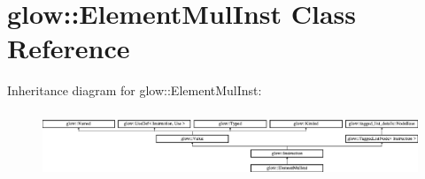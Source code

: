 \hypertarget{classglow_1_1_element_mul_inst}{}\section{glow\+:\+:Element\+Mul\+Inst Class Reference}
\label{classglow_1_1_element_mul_inst}
Inheritance diagram for glow\+:\+:Element\+Mul\+Inst\+:\begin{figure}[H]
\begin{center}
\leavevmode
\includegraphics[height=1.991111cm]{classglow_1_1_element_mul_inst}
\end{center}
\end{figure}
